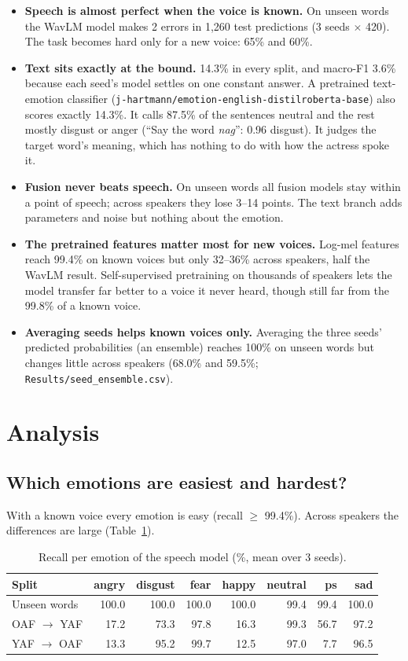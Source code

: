 \documentclass[11pt,a4paper]{article}
\newcommand{\code}[1]{\texttt{#1}}
\begin{document}
\begin{itemize}
\item \textbf{Speech is almost perfect when the voice is known.} On unseen words the WavLM model makes 2 errors in
1,260 test predictions (3 seeds $\times$ 420). The task becomes hard only for a new voice: 65\% and 60\%.
\item \textbf{Text sits exactly at the bound.} 14.3\% in every split, and macro-F1 3.6\% because each seed's model
settles on one constant answer. A pretrained text-emotion classifier
(\code{j-hartmann/}\allowbreak\code{emotion-english-distilroberta-base}) also scores exactly 14.3\%. It calls 87.5\%
of the sentences neutral and the rest mostly disgust or anger (``Say the word \emph{nag}'': 0.96 disgust). It judges
the target word's meaning, which has nothing to do with how the actress spoke it.
\item \textbf{Fusion never beats speech.} On unseen words all fusion models stay within a point of speech; across
speakers they lose 3--14 points. The text branch adds parameters and noise but nothing about the emotion.
\item \textbf{The pretrained features matter most for new voices.} Log-mel features reach 99.4\% on known voices
but only 32--36\% across speakers, half the WavLM result. Self-supervised pretraining on thousands of speakers lets
the model transfer far better to a voice it never heard, though still far from the 99.8\% of a known voice.
\item \textbf{Averaging seeds helps known voices only.} Averaging the three seeds' predicted probabilities (an
ensemble) reaches 100\% on unseen words but changes little across speakers (68.0\% and 59.5\%;
\code{Results/seed\_ensemble.csv}).
\end{itemize}

\section{Analysis}
\label{sec:analysis}
\subsection{Which emotions are easiest and hardest?}
With a known voice every emotion is easy (recall $\geq$ 99.4\%). Across speakers the differences are large
(Table~\ref{tab:recall}).
\begin{table}[!htbp]\centering\small
\caption{Recall per emotion of the speech model (\%, mean over 3 seeds).}
\label{tab:recall}
\begin{tabular}{@{}lrrrrrrr@{}}
\toprule
Split & angry & disgust & fear & happy & neutral & ps & sad \\
\midrule
Unseen words & 100.0 & 100.0 & 100.0 & 100.0 & 99.4 & 99.4 & 100.0 \\
OAF $\to$ YAF & 17.2 & 73.3 & 97.8 & 16.3 & 99.3 & 56.7 & 97.2 \\
YAF $\to$ OAF & 13.3 & 95.2 & 99.7 & 12.5 & 97.0 & 7.7 & 96.5 \\
\bottomrule
\end{tabular}
\end{table}
\end{document}
